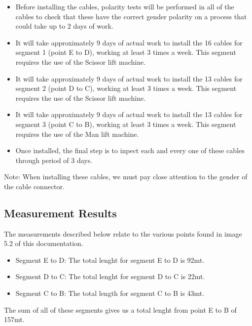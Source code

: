 \begin{itemize}

  \item Before installing the cables, polarity tests will be performed in all of the cables to check that these have the correct gender polarity on a process that could take up to 2 days of work.  
  
  \item It will take approximately 9 days of actual work to install the 16 cables for segment 1 (point E to D), working at least 3 times a week. This segment requires the use of the Scissor lift machine. 
  
  \item It will take approximately 9 days of actual work to install the 13 cables for segment 2 (point D to C), working at least 3 times a week. This segment requires the use of the Scissor lift machine.
  
  \item It will take approximately 9 days of actual work to install the 13 cables for segment 3 (point C to B), working at least 3 times a week. This segment requires the use of the Man lift machine.
  
  \item Once installed, the final step is to inpect each and every one of these cables through period of 3 days. 
\end{itemize}

Note: When installing these cables, we must pay close attention to the gender of the cable connector.

\subsection{Measurement Results}

The measurements described below relate to the various points found in image 5.2 of this documentation.

\begin{itemize}
  \item Segment E to D: The total lenght for segment E to D is 92mt.
  \item Segment D to C: The total lenght for segment D to C is 22mt.
  \item Segment C to B: The total length for segment C to B is 43mt.
\end{itemize} 

The sum of all of these segments gives us a total lenght from point E to B of 157mt.

